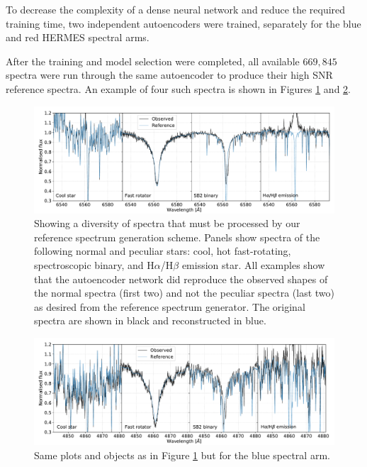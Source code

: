 To decrease the complexity of a dense neural network and reduce the required training time, two independent autoencoders were trained, separately for the blue and red HERMES spectral arms.

After the training and model selection were completed, all available $669,845$ spectra were run through the same autoencoder to produce their high SNR reference spectra. An example of four such spectra is shown in Figures \ref{fig:refann} and \ref{fig:refann2}.

\begin{figure}
	\centering
	\includegraphics[width=\textwidth]{sample_spectra_spectra_ccd3.pdf}
	\caption{Showing a diversity of spectra that must be processed by our reference spectrum generation scheme. Panels show spectra of the following normal and peculiar stars: cool, hot fast-rotating, spectroscopic binary, and H$\alpha$/H$\beta$ emission star. All examples show that the autoencoder network did reproduce the observed shapes of the normal spectra (first two) and not the peculiar spectra (last two) as desired from the reference spectrum generator. The original spectra are shown in black and reconstructed in blue.}
	\label{fig:refann}
\end{figure}

\begin{figure}
	\centering
	\includegraphics[width=\textwidth]{sample_spectra_spectra_ccd1.pdf}
	\caption{Same plots and objects as in Figure \ref{fig:refann} but for the blue spectral arm.}
	\label{fig:refann2}
\end{figure}

